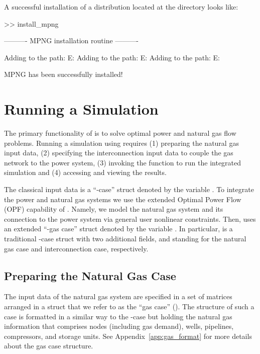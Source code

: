 \noindent A successful installation of a distribution located at the directory \mpnggitpath{} looks like:

\begin{Notice}
>> install_mpng

---------- MPNG installation routine ---------- 

Adding to the path: E:\GITHUB\MPNG\Functions
Adding to the path: E:\GITHUB\MPNG\Cases
Adding to the path: E:\GITHUB\MPNG\Examples

MPNG has been successfully installed!	
\end{Notice} 

\section{Running a Simulation}
\label{sec:simulate}

The primary functionality of \mpng{} is to solve optimal power and natural gas flow problems. Running a simulation using \mpng{} requires (1) preparing the natural gas input data, (2) specifying the interconnection input data to couple the gas network to the power system, (3) invoking the function to run the integrated simulation and (4) accessing and viewing the results.

The classical \matpower{} input data is a ``\matpower{}-case'' struct denoted by the variable \cite{matpower_manual}. To integrate the power and natural gas systems we use the extended Optimal Power Flow (OPF) capability of \matpower{}. Namely, we model the natural gas system and its connection to the power system via general user nonlinear constraints. Then, \mpng{} uses an extended ``\matpower{}-gas case'' struct denoted by the variable . In particular,  is a traditional \matpower{}-case struct with two additional fields,  and  standing for the natural gas case and interconnection case, respectively.

\subsection{Preparing the Natural Gas Case}
\label{subsec:gas_case}

The input data of the natural gas system are specified in a set of matrices arranged in a \matlab{} struct that we refer to as the ``gas case'' (). The structure of such a case is formatted in a similar way to the \matpower{}-case but holding the natural gas information that comprises nodes (including gas demand), wells, pipelines, compressors, and storage units. See Appendix~\ref{app:gas_format} for more details about the gas case structure.

